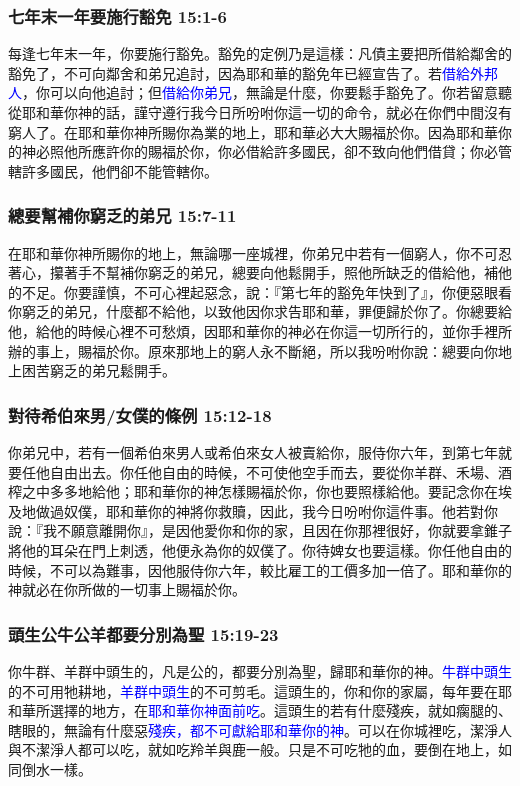 \subsubsection{七年末一年要施行豁免 15:1-6}
每逢七年末一年，你要施行豁免。豁免的定例乃是這樣：凡債主要把所借給鄰舍的豁免了，不可向鄰舍和弟兄追討，因為耶和華的豁免年已經宣告了。若\textcolor{blue}{借給外邦人}，你可以向他追討；但\textcolor{blue}{借給你弟兄}，無論是什麼，你要鬆手豁免了。你若留意聽從耶和華你神的話，謹守遵行我今日所吩咐你這一切的命令，就必在你們中間沒有窮人了。在耶和華你神所賜你為業的地上，耶和華必大大賜福於你。因為耶和華你的神必照他所應許你的賜福於你，你必借給許多國民，卻不致向他們借貸；你必管轄許多國民，他們卻不能管轄你。

\subsubsection{總要幫補你窮乏的弟兄 15:7-11}
在耶和華你神所賜你的地上，無論哪一座城裡，你弟兄中若有一個窮人，你不可忍著心，攥著手不幫補你窮乏的弟兄，總要向他鬆開手，照他所缺乏的借給他，補他的不足。你要謹慎，不可心裡起惡念，說：『第七年的豁免年快到了』，你便惡眼看你窮乏的弟兄，什麼都不給他，以致他因你求告耶和華，罪便歸於你了。你總要給他，給他的時候心裡不可愁煩，因耶和華你的神必在你這一切所行的，並你手裡所辦的事上，賜福於你。原來那地上的窮人永不斷絕，所以我吩咐你說：總要向你地上困苦窮乏的弟兄鬆開手。

\subsubsection{對待希伯來男/女僕的條例 15:12-18}
你弟兄中，若有一個希伯來男人或希伯來女人被賣給你，服侍你六年，到第七年就要任他自由出去。你任他自由的時候，不可使他空手而去，要從你羊群、禾場、酒榨之中多多地給他；耶和華你的神怎樣賜福於你，你也要照樣給他。要記念你在埃及地做過奴僕，耶和華你的神將你救贖，因此，我今日吩咐你這件事。他若對你說：『我不願意離開你』，是因他愛你和你的家，且因在你那裡很好，你就要拿錐子將他的耳朵在門上刺透，他便永為你的奴僕了。你待婢女也要這樣。你任他自由的時候，不可以為難事，因他服侍你六年，較比雇工的工價多加一倍了。耶和華你的神就必在你所做的一切事上賜福於你。


\subsubsection{頭生公牛公羊都要分別為聖 15:19-23}
你牛群、羊群中頭生的，凡是公的，都要分別為聖，歸耶和華你的神。\textcolor{blue}{牛群中頭生}的不可用牠耕地，\textcolor{blue}{羊群中頭生}的不可剪毛。這頭生的，你和你的家屬，每年要在耶和華所選擇的地方，在\textcolor{blue}{耶和華你神面前吃}。這頭生的若有什麼殘疾，就如瘸腿的、瞎眼的，無論有什麼惡\textcolor{blue}{殘疾，都不可獻給耶和華你的神}。可以在你城裡吃，潔淨人與不潔淨人都可以吃，就如吃羚羊與鹿一般。只是不可吃牠的血，要倒在地上，如同倒水一樣。

